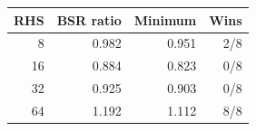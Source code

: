 \begin{tabular}{rrrr}
\toprule
RHS & BSR ratio & Minimum & Wins \\
\midrule
8 & 0.982 & 0.951 & 2/8 \\
16 & 0.884 & 0.823 & 0/8 \\
32 & 0.925 & 0.903 & 0/8 \\
64 & 1.192 & 1.112 & 8/8 \\
\bottomrule
\end{tabular}
